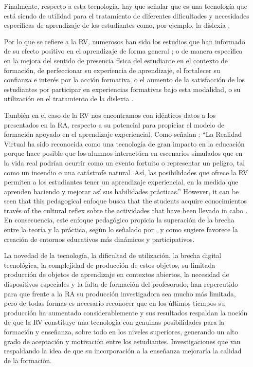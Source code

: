 \documentclass[spanish]{textolivre}
\begin{document}
Finalmente, respecto a esta tecnología, hay que señalar que es una tecnología que está siendo de utilidad para el tratamiento de diferentes dificultades y necesidades específicas de aprendizaje de los estudiantes como, por ejemplo, la dislexia \cite{fernandez-batanero2021impacto,ausin_villaverde_2023}.

Por lo que se refiere a la RV, numerosos han sido los estudios que han informado de su efecto positivo en el aprendizaje de forma general \cite{calderon2020realidad,tang2020evaluating,toala2020realidad,george2023imbricacion}; o de manera específica en la mejora del sentido de presencia física del estudiante en el contexto de formación, de perfeccionar su experiencia de aprendizaje, el fortalecer su confianza e interés por la acción formativa, o el aumento de la satisfacción de los estudiantes por participar en experiencias formativas bajo esta modalidad, o su utilización en el tratamiento de la dislexia \cite{ogbuanya2018investigating,chang2019effects,mcgovern2020application,ausin_villaverde_2023,king2020problematic}.

También en el caso de la RV nos encontramos con idénticos datos a los presentados en la RA, respecto a su potencial para propiciar el modelo de formación apoyado en el aprendizaje experiencial. Como señalan \textcite[p.~153]{acuna_rangel_2021}: “La Realidad Virtual ha sido reconocida como una tecnología de gran impacto en la educación porque hace posible que los alumnos interactúen en escenarios simulados que en la vida real podrían ocurrir como un evento fortuito o representar un peligro, tal como un incendio o una catástrofe natural. Así, las posibilidades que ofrece la RV permiten a los estudiantes tener un aprendizaje experiencial, en la medida que aprenden haciendo y mejorar así sus habilidades prácticas.” However, it can be seen that this pedagogical enfoque busca that the students acquire conocimientos través of the cultural reflex sobre the actividades that have been llevado in cabo \cite{chang2019effects,fromm2021more,scavarelli2019towards}. En consecuencia, este enfoque pedagógico propicia la superación de la brecha entre la teoría y la práctica, según lo señalado por \textcite{brown_2020}, y como sugiere \textcite{yu_2021} favorece la creación de entornos educativos más dinámicos y participativos. 

La novedad de la tecnología, la dificultad de utilización, la brecha digital tecnológica, la complejidad de producción de estos objetos, su limitada producción de objetos de aprendizaje en contextos abiertos, la necesidad de dispositivos especiales y la falta de formación del profesorado, han repercutido para que frente a la RA su producción investigadora sea mucho más limitada, pero de todas formas es necesario reconocer que en los últimos tiempos su producción ha aumentado considerablemente \cite{chen2023effectiveness,marougkas2023virtual} y sus resultados respaldan la noción de que la RV constituye una tecnología con genuinas posibilidades para la formación y enseñanza, sobre todo en los niveles superiores, generando un alto grado de aceptación y motivación entre los estudiantes. Investigaciones que van respaldando la idea de que su incorporación a la enseñanza mejoraría la calidad de la formación.
\end{document}
